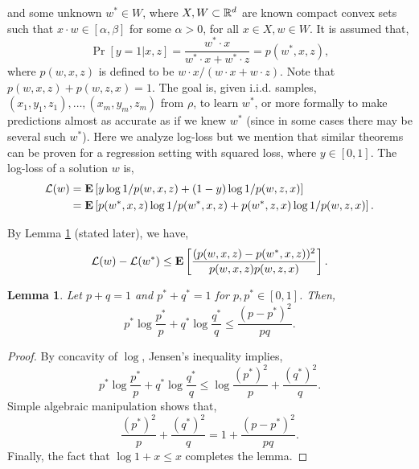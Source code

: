 \documentclass{article}
\newtheorem{lemma}{Lemma}
\begin{document}
and some unknown $w^* \in W$, where $X,W \subset \mathbb{R}^d$ are known compact convex sets such that $x \cdot w \in [\alpha,\beta]$ for some $\alpha>0$, for all $x\in X, w \in W$.  It is assumed that,
$$
\Pr[y=1|x,z] = \frac{w^* \cdot x}{w^* \cdot x + w^* \cdot z}=p(w^*,x,z),$$
where $p(w,x,z)$ is defined to be $w\cdot x/(w \cdot x+w\cdot z)$.  Note that $p(w,x,z)+p(w,z,x)=1$.  The goal is, given i.i.d. samples, $(x_1,y_1,z_1),\ldots,(x_m,y_m,z_m)$ from $\rho$, to learn $w^*$, or more formally to make predictions almost as accurate as if we knew $w^*$ (since in some cases there may be several such $w^*$).  Here we analyze log-loss but we mention that similar theorems can be proven for a regression setting with squared loss, where  $y \in [0,1]$.
The log-loss of a solution $w$ is,
\begin{align*}
\mathcal{L}(w) &= {\bf E}\left[ y \log 1/p(w,x,z) + (1-y)  \log 1/p(w,z,x)\right] \\
&=
{\bf E}\left[ p(w^*,x,z) \log 1/p(w^*,x,z) + p(w^*,z,x) \log 1/p(w,z,x)\right].
\end{align*}

By Lemma \ref{lem:appx1} (stated later), we have,
$$\mathcal{L}(w) -\mathcal{L}(w^*) \leq {\bf E}\left[\frac{(p(w,x,z)-p(w^*,x,z))^2}{p(w,x,z)p(w,z,x)}\right].$$


\begin{lemma}\label{lem:appx1}
Let $p+q=1$ and $p^*+q^*=1$ for $p,p^* \in [0,1]$.  Then,
$$p^* \log \frac{p^*}{p} + q^* \log \frac{q^*}{q} \leq \frac{(p-p^*)^2}{pq}.$$
\end{lemma}
\begin{proof}
By concavity of $\log$, Jensen's inequality implies,
$$p^* \log \frac{p^*}{p} + q^* \log \frac{q^*}{q}  \leq \log \frac{(p^*)^2}{p} + \frac{(q^*)^2}{q}.$$
Simple algebraic manipulation shows that,
$$\frac{(p^*)^2}{p} + \frac{(q^*)^2}{q} = 1 + \frac{(p-p^*)^2}{pq}.$$
Finally, the fact that $\log 1+x \leq x$ completes the lemma.
\end{proof}





\end{document}
